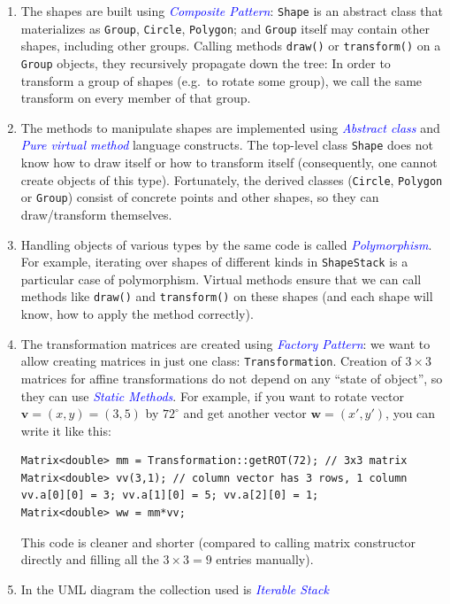 \documentclass[11pt]{article}
\begin{document}
\begin{enumerate}
\item 
The shapes are built using \textcolor{blue}{\em Composite Pattern}:
{\tt Shape} is an abstract class that materializes 
as {\tt Group}, {\tt Circle}, {\tt Polygon}; and {\tt Group} itself may contain other shapes, 
including other groups. Calling methods {\tt draw()} or {\tt transform()} on a {\tt Group} objects, 
they recursively propagate down the tree: In order to transform a group of shapes (e.g.\ to rotate 
some group), we call the same transform on every member of that group.
\item 
The methods to manipulate shapes are implemented using \textcolor{blue}{\em Abstract class}
and \textcolor{blue}{\em Pure virtual method} language constructs. The top-level class {\tt Shape} 
does not know how to draw itself or how to transform itself (consequently, one 
cannot create objects of this type). Fortunately, the 
derived classes ({\tt Circle}, {\tt Polygon} or {\tt Group}) consist of concrete points
and other shapes, so they can draw/transform themselves.
\item 
Handling objects of various types by the same code is called \textcolor{blue}{\em Polymorphism}. 
For example, iterating over shapes of different kinds in {\tt ShapeStack} is a particular case of polymorphism.
Virtual methods ensure that we can call methods like {\tt draw()} and {\tt transform()} on 
these shapes (and each shape will know, how to apply the method correctly).
\item 
The transformation matrices are created using \textcolor{blue}{\em Factory Pattern}: 
we want to allow creating matrices in just one class: {\tt Transformation}. 
Creation of $3 \times 3$  matrices for affine transformations
do not depend on any ``state of object'', so they can use 
\textcolor{blue}{\em Static Methods}. 
For example, if you want to rotate vector $\mathbf{v}=(x,y)=(3,5)$ by $72^{\circ}$
and get another vector $\mathbf{w}=(x',y')$, you can write it like this:
\begin{verbatim}
Matrix<double> mm = Transformation::getROT(72); // 3x3 matrix
Matrix<double> vv(3,1); // column vector has 3 rows, 1 column
vv.a[0][0] = 3; vv.a[1][0] = 5; vv.a[2][0] = 1; 
Matrix<double> ww = mm*vv;
\end{verbatim}
This code is cleaner and shorter (compared to calling matrix constructor directly and filling 
all the $3 \times 3 =9$ entries manually). 
\item 
In the UML diagram the collection used is \textcolor{blue}{\em Iterable Stack} \textendash{}

\end{enumerate}
\end{document}
